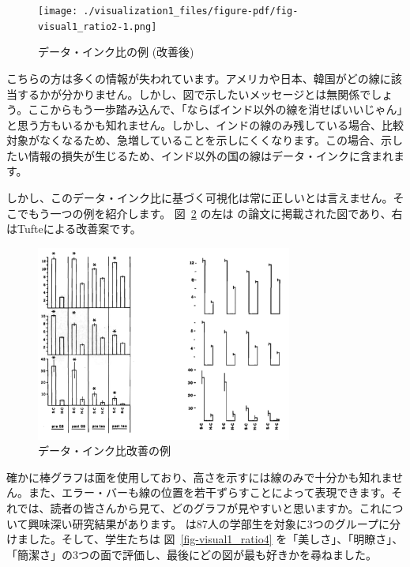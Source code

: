 \documentclass[
  a4paper,
  pandoc,
  ja=standard,
  jafont=haranoaji]{bxjsbook}
\begin{document}
\begin{figure}

{\centering \texttt{[image: ./visualization1\_files/figure-pdf/fig-visual1\_ratio2-1.png]}

}

\caption{\label{fig-visual1_ratio2}データ・インク比の例 (改善後)}

\end{figure}

こちらの方は多くの情報が失われています。アメリカや日本、韓国がどの線に該当するかが分かりません。しかし、図で示したいメッセージとは無関係でしょう。ここからもう一歩踏み込んで、「ならばインド以外の線を消せばいいじゃん」と思う方もいるかも知れません。しかし、インドの線のみ残している場合、比較対象がなくなるため、急増していることを示しにくくなります。この場合、示したい情報の損失が生じるため、インド以外の国の線はデータ・インクに含まれます。

しかし、このデータ・インク比に基づく可視化は常に正しいとは言えません。そこでもう一つの例を紹介します。
図~\ref{fig-visual1_ratio3} の左は \citet{Kuznicki_McCutcheon:1979}
の論文に掲載された図であり、右はTufteによる改善案です。

\begin{figure}

{\centering \includegraphics[width=0.75\textwidth,height=\textheight]{./Figs/Visualization1/Dataink_ratio2.png}

}

\caption{\label{fig-visual1_ratio3}データ・インク比改善の例}

\end{figure}

確かに棒グラフは面を使用しており、高さを示すには線のみで十分かも知れません。また、エラー・バーも線の位置を若干ずらすことによって表現できます。それでは、読者の皆さんから見て、どのグラフが見やすいと思いますか。これについて興味深い研究結果があります。\citet{Inbar_et_al:2007}
は87人の学部生を対象に3つのグループに分けました。そして、学生たちは
図~\ref{fig-visual1_ratio4}
を「美しさ」、「明瞭さ」、「簡潔さ」の3つの面で評価し、最後にどの図が最も好きかを尋ねました。
\end{document}
